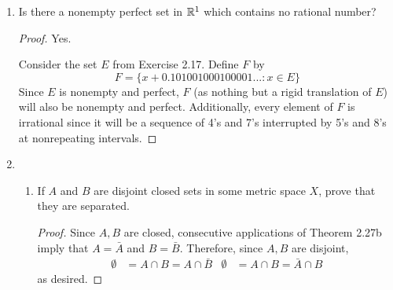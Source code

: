 \documentclass[../psets.tex]{subfiles}
\begin{document}
\begin{enumerate}[label={\textbf{\arabic*.}}]
\begin{proof}
\begin{equation*}
        \end{equation*}
        a contradiction.\par
        Yes, $E$ is perfect. To prove this, it will suffice to show that every $x\in E$ is a limit point of $E$. Let $p\in E$ be arbitrary, and let $N_r(p)$ be any neighborhood of $p$. By the Archimedean property, find an $m\in\N$ such that $mr>1$. Now round $m$ up to the next multiple of 10, i.e., find $n$ such that $10^n\geq m$. It follows that $1/10^n<r$. Let $q$ be the number with decimal expansion identical to $p$ except at the $(n+1)^\text{th}$ slot, where whatever's there (4 or 7) is flipped (to 7 or 4). It follows that
        \begin{equation*}
            |q-p| = \frac{7-4}{10^{n+1}}
            < \frac{1}{10^n}
            < r
        \end{equation*}
        so $q\neq p$ satisfies $q\in N_r(p)$, as desired.
    \end{proof}
    \item Is there a nonempty perfect set in $\mathbb{R}^1$ which contains no rational number?
    \begin{proof}
        Yes.\par
        Consider the set $E$ from Exercise 2.17. Define $F$ by
        \begin{equation*}
            F = \{x+0.101001000100001...:x\in E\}
        \end{equation*}
        Since $E$ is nonempty and perfect, $F$ (as nothing but a rigid translation of $E$) will also be nonempty and perfect. Additionally, every element of $F$ is irrational since it will be a sequence of 4's and 7's interrupted by 5's and 8's at nonrepeating intervals.
    \end{proof}
    \item 
    \begin{enumerate}
        \item If $A$ and $B$ are disjoint closed sets in some metric space $X$, prove that they are separated.
        \begin{proof}
            Since $A,B$ are closed, consecutive applications of Theorem 2.27b imply that $A=\bar{A}$ and $B=\bar{B}$. Therefore, since $A,B$ are disjoint,
            \begin{align*}
                \emptyset &= A\cap B = A\cap\bar{B}&
                \emptyset &= A\cap B = \bar{A}\cap B
            \end{align*}
            as desired.
        \end{proof}

\end{enumerate}
\end{enumerate}
\end{document}
